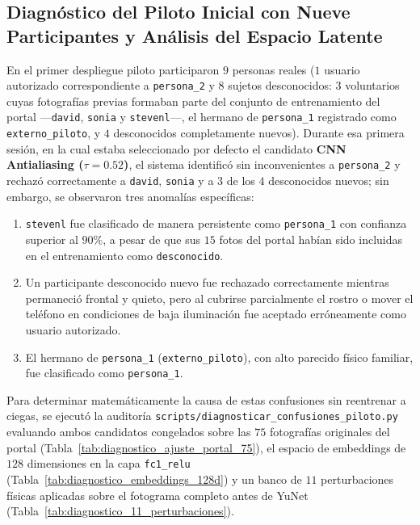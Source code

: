 \documentclass{article}
\begin{document}
\subsection{Diagnóstico del Piloto Inicial con Nueve Participantes y Análisis del Espacio Latente}
En el primer despliegue piloto participaron $9$ personas reales ($1$ usuario autorizado correspondiente a \texttt{persona\_2} y $8$ sujetos desconocidos: $3$ voluntarios cuyas fotografías previas formaban parte del conjunto de entrenamiento del portal ---\texttt{david}, \texttt{sonia} y \texttt{stevenl}---, el hermano de \texttt{persona\_1} registrado como \texttt{externo\_piloto}, y $4$ desconocidos completamente nuevos). Durante esa primera sesión, en la cual estaba seleccionado por defecto el candidato \textbf{CNN Antialiasing ($\tau = 0.52$)}, el sistema identificó sin inconvenientes a \texttt{persona\_2} y rechazó correctamente a \texttt{david}, \texttt{sonia} y a $3$ de los $4$ desconocidos nuevos; sin embargo, se observaron tres anomalías específicas:
\begin{enumerate}
    \item \texttt{stevenl} fue clasificado de manera persistente como \texttt{persona\_1} con confianza superior al $90\%$, a pesar de que sus $15$ fotos del portal habían sido incluidas en el entrenamiento como \texttt{desconocido}.
    \item Un participante desconocido nuevo fue rechazado correctamente mientras permaneció frontal y quieto, pero al cubrirse parcialmente el rostro o mover el teléfono en condiciones de baja iluminación fue aceptado erróneamente como usuario autorizado.
    \item El hermano de \texttt{persona\_1} (\texttt{externo\_piloto}), con alto parecido físico familiar, fue clasificado como \texttt{persona\_1}.
\end{enumerate}

Para determinar matemáticamente la causa de estas confusiones sin reentrenar a ciegas, se ejecutó la auditoría \texttt{scripts/diagnosticar\_confusiones\_piloto.py} evaluando ambos candidatos congelados sobre las $75$ fotografías originales del portal (Tabla~\ref{tab:diagnostico_ajuste_portal_75}), el espacio de embeddings de $128$ dimensiones en la capa \texttt{fc1\_relu} (Tabla~\ref{tab:diagnostico_embeddings_128d}) y un banco de $11$ perturbaciones físicas aplicadas sobre el fotograma completo antes de YuNet (Tabla~\ref{tab:diagnostico_11_perturbaciones}).
\end{document}
